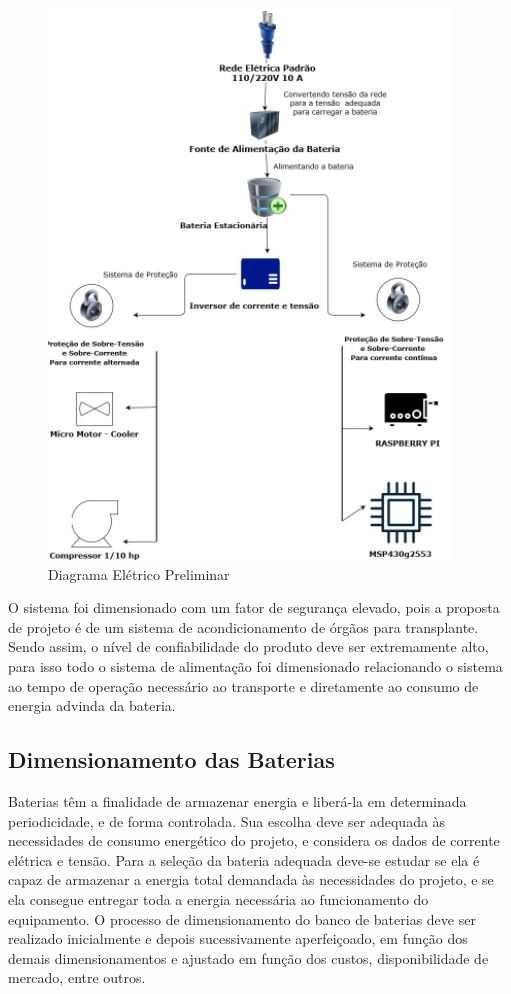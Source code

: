 \begin{figure}[H]
\begin{center}
\includegraphics[scale = 1.2]{figuras/Diagrama_Simp.JPG}
\caption{ Diagrama Elétrico Preliminar}
\end{center}
\end{figure}

O sistema foi dimensionado com um fator de segurança elevado, pois a proposta de projeto é de um sistema de acondicionamento de órgãos para transplante. Sendo assim, o nível de confiabilidade do produto deve ser extremamente alto, para isso todo o sistema de alimentação foi dimensionado relacionando o sistema ao tempo de operação necessário ao transporte e diretamente ao consumo de energia advinda da bateria.


\subsection{Dimensionamento das Baterias}
	Baterias têm a finalidade de armazenar energia e liberá-la em determinada periodicidade, e de forma controlada. Sua escolha deve ser adequada às necessidades de consumo energético do projeto, e considera os dados de corrente elétrica e tensão. Para a seleção da bateria adequada deve-se estudar se ela é capaz de armazenar a energia total demandada às necessidades do projeto, e se ela consegue entregar toda a energia necessária ao funcionamento do equipamento. O processo de dimensionamento do banco de baterias deve ser realizado inicialmente e depois sucessivamente aperfeiçoado, em função dos demais dimensionamentos e ajustado em função dos custos, disponibilidade de mercado, entre outros.

